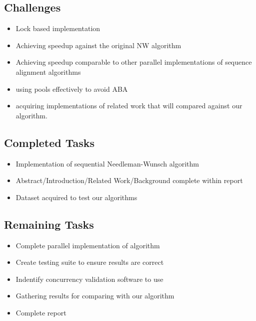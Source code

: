 \documentclass[letterpaper, 10 pt, conference]{IEEEconf}
\begin{document}
\subsection{Challenges}
\begin{itemize}
	\item
	Lock based implementation
	\item
	Achieving speedup against the original NW algorithm
	\item 
	Achieving speedup comparable to other parallel implementations of sequence alignment algorithms
	\item
	using pools effectively to avoid ABA
	\item 
	acquiring implementations of related work that will compared against our algorithm. 
\end{itemize}

\subsection{Completed Tasks}
\begin{itemize}
	\item
	Implementation of sequential Needleman-Wunsch algorithm
	\item
	Abstract/Introduction/Related Work/Background complete within report
	\item
	Dataset acquired to test our algorithms
\end{itemize}


\subsection{Remaining Tasks}
\begin{itemize}
	\item
	Complete parallel implementation of algorithm
	\item
	Create testing suite to ensure results are correct
	\item
	Indentify concurrency validation software to use
	\item
	Gathering results for comparing with our algorithm
	\item
	Complete report
\end{itemize}




\end{document}
